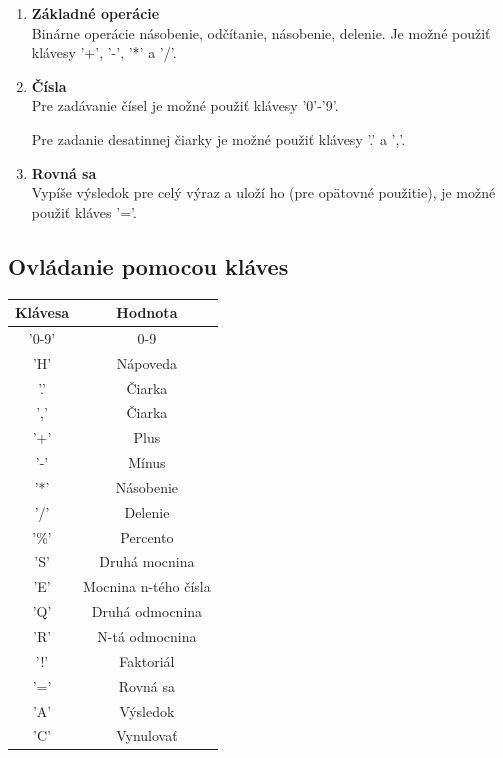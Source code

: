 \documentclass[11pt, a4paper]{article}
\begin{document}
\begin{enumerate}
    \item \textbf{Základné operácie}\\
    Binárne operácie násobenie, odčítanie, násobenie, delenie. Je možné použiť klávesy '+', '-', '*' a '/'.
    
    \item \textbf{Čísla}\\
    Pre zadávanie čísel je možné použiť klávesy '0'-'9'.
    
    Pre zadanie desatinnej čiarky je možné použiť klávesy '.' a ','.
    
    \item \textbf{Rovná sa}\\
    Vypíše výsledok pre celý výraz a uloží ho (pre opätovné použitie), je možné použiť kláves '='.
\end{enumerate}
\newpage
\subsection{Ovládanie pomocou kláves}
\begin{table}[H]
\begin{center}
\begin{tabular}{|c|c|}
\hline
\textbf{Klávesa} & \textbf{Hodnota}     \\ \hline
'0-9'            & 0-9                  \\ \hline
'H'              & Nápoveda             \\ \hline
'.'              & Čiarka               \\ \hline
','              & Čiarka               \\ \hline
'+'              & Plus                 \\ \hline
'-'              & Mínus                \\ \hline
'*'              & Násobenie            \\ \hline
'/'              & Delenie              \\ \hline
'\%'             & Percento             \\ \hline
'S'              & Druhá mocnina        \\ \hline
'E'              & Mocnina n-tého čísla \\ \hline
'Q'              & Druhá odmocnina      \\ \hline
'R'              & N-tá odmocnina      \\ \hline
'!'              & Faktoriál            \\ \hline
'='              & Rovná sa             \\ \hline
'A'              & Výsledok             \\ \hline
'C'              & Vynulovať            \\ \hline
\end{tabular}
\end{center}
\end{table}
\end{document}
